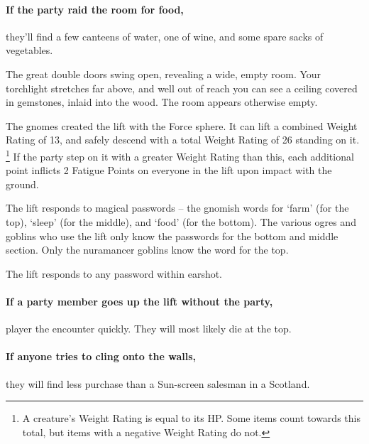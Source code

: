 \begin{multicols}{2}



\paragraph{If the party raid the room for food,}
they'll find a few canteens of water, one of wine, and some spare sacks of vegetables.

\label{lift}

\begin{boxtext}

	The great double doors swing open, revealing a wide, empty room.
	Your torchlight stretches far above, and well out of reach you can see a ceiling covered in gemstones, inlaid into the wood.
	The room appears otherwise empty.

\end{boxtext}

The gnomes created the lift with the Force sphere.
It can lift a combined Weight Rating of 13, and safely descend with a total Weight Rating of 26 standing on it.%
\footnote{A creature's Weight Rating is equal to its HP.
Some items count towards this total, but items with a negative Weight Rating do not.}
If the party step on it with a greater Weight Rating than this, each additional point inflicts 2 Fatigue Points on everyone in the lift upon impact with the ground.

The lift responds to magical passwords -- the gnomish words for `farm' (for the top), `sleep' (for the middle), and `food' (for the bottom).
The various ogres and goblins who use the lift only know the passwords for the bottom and middle section.
Only the nuramancer goblins know the word for the top.

The lift responds to any password within earshot.

\paragraph{If a party member goes up the lift without the party,}
player the encounter quickly.
They will most likely die at the top.

\paragraph{If anyone tries to cling onto the walls,}
they will find less purchase than a Sun-screen salesman in a Scotland.


\end{multicols}
